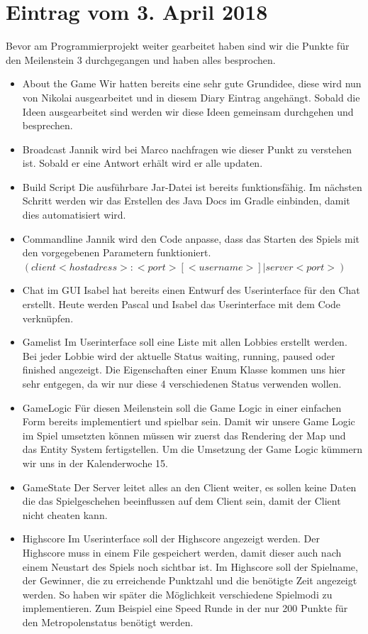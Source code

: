 \documentclass{scrartcl}
\newcommand{\n}{\newline}
\begin{document}
\section*{Eintrag vom 3. April 2018}
Bevor am Programmierprojekt weiter gearbeitet haben sind wir die Punkte für den Meilenstein 3 durchgegangen und haben alles besprochen. \n
\begin{itemize}
	\item About the Game\n
	Wir hatten bereits eine sehr gute Grundidee, diese wird nun von Nikolai ausgearbeitet und in diesem Diary Eintrag angehängt. Sobald die Ideen ausgearbeitet sind werden wir diese Ideen gemeinsam durchgehen und besprechen. 
	\item Broadcast \n
	Jannik wird bei Marco nachfragen wie dieser Punkt zu verstehen ist. Sobald er eine Antwort erhält wird er alle updaten.
	\item Build Script \n
	Die ausführbare Jar-Datei ist bereits funktionsfähig. Im nächsten Schritt werden wir das Erstellen des Java Docs im Gradle einbinden, damit dies automatisiert wird.
	\item Commandline \n
	Jannik wird den Code anpasse, dass das Starten des Spiels mit den vorgegebenen Parametern funktioniert.\n
	$(client <hostadress>:<port> [<username>]  |  server <port>)$
	\item Chat im GUI \n
	Isabel hat bereits einen Entwurf des Userinterface für den Chat erstellt. Heute werden Pascal und Isabel das Userinterface mit dem Code verknüpfen.
	\item Gamelist \n
	Im Userinterface soll eine Liste mit allen Lobbies erstellt werden. Bei jeder Lobbie wird der aktuelle Status waiting, running, paused oder finished angezeigt. Die Eigenschaften einer Enum Klasse kommen uns hier sehr entgegen, da wir nur diese 4 verschiedenen Status verwenden wollen. 
	\item GameLogic \n
	Für diesen Meilenstein soll die Game Logic in einer einfachen Form bereits implementiert und spielbar sein. Damit wir unsere Game Logic im Spiel umsetzten können müssen wir zuerst das Rendering der Map und das Entity System fertigstellen. Um die Umsetzung der Game Logic kümmern wir uns in der Kalenderwoche 15.
	\item GameState \n
	Der Server leitet alles an den Client weiter, es sollen keine Daten die das Spielgeschehen beeinflussen auf dem Client sein, damit der Client nicht cheaten kann. 
	\item Highscore \n
	Im Userinterface soll der Highscore angezeigt werden. Der Highscore muss in einem File gespeichert werden, damit dieser auch nach einem Neustart des Spiels noch sichtbar ist. Im Highscore soll der Spielname, der Gewinner, die zu erreichende Punktzahl und die benötigte Zeit angezeigt werden. So haben wir später die Möglichkeit verschiedene Spielmodi zu implementieren. Zum Beispiel eine Speed Runde in der nur 200 Punkte für den Metropolenstatus benötigt werden.

\end{itemize}
\end{document}
